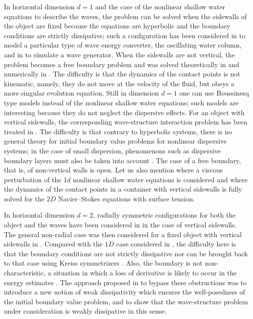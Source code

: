\documentclass[JEP,XML,SOM,Unicode,NoFloatCountersInSection,published]{cedram}
\theoremstyle{definition}
\begin{document}
In horizontal dimension $d=1$ and the case of the nonlinear shallow water equations to describe the waves,
the problem can be solved when the sidewalls of the object are fixed because the equations are hyperbolic and the boundary conditions are strictly dissipative;
such a configuration has been considered in \cite{BocchiHeVergara} to model a particular type of wave energy converter, the oscillating water column,
and in \cite{SuTucsnak} to simulate a wave generator.
When the sidewalls are not vertical,
the problem becomes a free boundary problem and was solved theoretically in \cite{IguchiLannes2021} and numerically in \cite{HaidarMarcheVilar}.
The difficulty is that the dynamics of the contact points is not kinematic, namely, they do not move at the velocity of the fluid,
but obeys a more singular evolution equation.
Still in dimension $d=1$ one can use Boussinesq type models instead of the nonlinear shallow water equations;
such models are interesting because they do not neglect the dispersive effects.
For an object with vertical sidewalls,
the corresponding wave-structure interaction problem has been treated in \cite{BreschLannesMetivier,BeckLannes,BeckLannesWeynans}.
The difficulty is that contrary to hyperbolic systems, there is no general theory for initial boundary value problems for nonlinear dispersive systems;
in the case of small dispersion, phenomenons such as dispersive boundary layers must also be taken into account \cite{BreschLannesMetivier}.
The case of a free boundary, that is, of non-vertical walls is open.
Let us also mention \cite{MSTT} where a viscous perturbation of the $1d$ nonlinear shallow water equations is considered and \cite{GuoTice,GuoTiceZheng}
where the dynamics of the contact points in a container with vertical sidewalls is fully solved for the $2D$ Navier--Stokes equations with surface tension.

In horizontal dimension $d=2$, radially symmetric configurations for both the object and the waves have been considered in \cite{Bocchi1,Bocchi2}
in the case of vertical sidewalls.
The general non-radial case was then considered for a fixed object with vertical sidewalls in \cite{IguchiLannes2023}.
Compared with the $1D$ case considered in \cite{IguchiLannes2021}, the difficulty here is that
the boundary conditions are not strictly dissipative nor can be brought back to that case using Kreiss symmetrizers \cite{Majda,Metivier,BenzoniSerre,Audiard}.
Also, the boundary is not non-characteristic,
a situation in which a loss of derivative is likely to occur in the energy estimates \cite{Gues,Secchi,MajdaOsher,CoulombelSecchi}.
The approach proposed in \cite{IguchiLannes2023} to bypass these obstructions was to introduce a new notion of weak dissipativity
which ensures the well-posedness of the initial boundary value problem,
and to show that the wave-structure problem under consideration is weakly dissipative in this sense.
\end{document}
